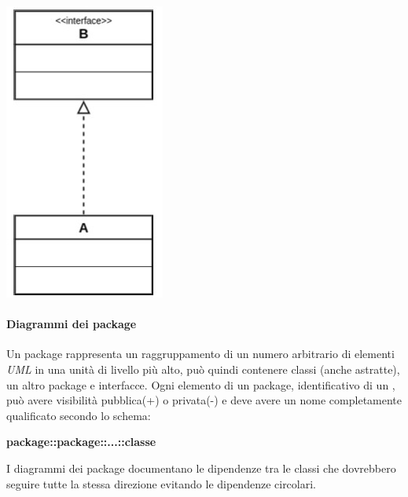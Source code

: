 \begin{itemize}
\begin{center}
\begin{minipage}{0.5\textwidth}
\begin{center}
						\includegraphics[scale=0.385]{Immagini/UML/Subtyping}\\
				\end{center}
			\end{minipage}
		\end{center}	
	\end{itemize}

\paragraph*{Diagrammi dei package}
Un package rappresenta un raggruppamento di un numero arbitrario di elementi \textit{UML} in una unità di livello più alto, può quindi contenere classi (anche astratte), un altro package e interfacce. Ogni elemento di un package, identificativo di un , può avere visibilità pubblica(+) o privata(-) e deve avere un nome completamente qualificato secondo lo schema: 
\begin{center}
	\textbf{package::package::...::classe}
\end{center}
I diagrammi dei package documentano le dipendenze tra le classi che dovrebbero seguire tutte la stessa direzione evitando le dipendenze circolari.

